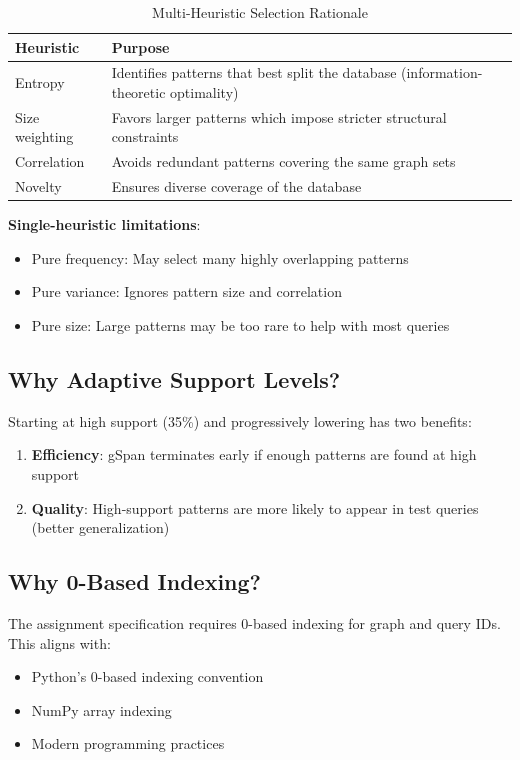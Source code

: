 \documentclass[12pt,a4paper]{article}
\begin{document}
\begin{table}[H]
\centering
\begin{tabular}{lp{8cm}}
\toprule
\textbf{Heuristic} & \textbf{Purpose} \\
\midrule
Entropy & Identifies patterns that best split the database (information-theoretic optimality) \\
Size weighting & Favors larger patterns which impose stricter structural constraints \\
Correlation & Avoids redundant patterns covering the same graph sets \\
Novelty & Ensures diverse coverage of the database \\
\bottomrule
\end{tabular}
\caption{Multi-Heuristic Selection Rationale}
\end{table}

\textbf{Single-heuristic limitations}:
\begin{itemize}
    \item Pure frequency: May select many highly overlapping patterns
    \item Pure variance: Ignores pattern size and correlation
    \item Pure size: Large patterns may be too rare to help with most queries
\end{itemize}

\subsection{Why Adaptive Support Levels?}

Starting at high support (35\%) and progressively lowering has two benefits:

\begin{enumerate}
    \item \textbf{Efficiency}: gSpan terminates early if enough patterns are found at high support
    \item \textbf{Quality}: High-support patterns are more likely to appear in test queries (better generalization)
\end{enumerate}

\subsection{Why 0-Based Indexing?}

The assignment specification requires 0-based indexing for graph and query IDs. This aligns with:
\begin{itemize}
    \item Python's 0-based indexing convention
    \item NumPy array indexing
    \item Modern programming practices
\end{itemize}
\end{document}
